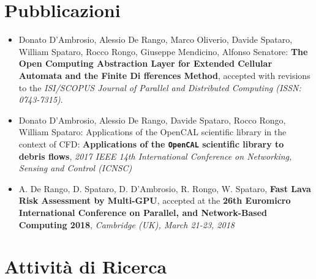 \section{Pubblicazioni}
\begin{itemize}
	\item  Donato D'Ambrosio, Alessio De Rango, Marco Oliverio, Davide Spataro,
	William Spataro, Rocco Rongo, Giuseppe Mendicino, Alfonso Senatore:
	\textbf{The Open Computing Abstraction Layer for Extended Cellular
	Automata and the Finite Di fferences Method}, accepted with revisions to
	the \textit{ISI/SCOPUS Journal of Parallel and Distributed Computing (ISSN:
	0743-7315)}.

\item Donato D'Ambrosio, Alessio De Rango, Davide Spataro, Rocco Rongo,
William Spataro: Applications of the OpenCAL scientific library in
the context of CFD: \textbf{Applications of the \texttt{OpenCAL} scientific library to debris flows}, \textit{2017 IEEE 14th
International Conference on Networking, Sensing and Control (ICNSC)}

\item A. De Rango, D. Spataro, D. D’Ambrosio, R. Rongo, W. Spataro, \textbf{Fast
Lava Risk Assessment by Multi-GPU}, accepted at the \textbf{26th Euromicro
International Conference on Parallel, and Network-Based Computing
2018}, \textit{Cambridge (UK), March 21-23, 2018}

\end{itemize}


\section{Attività di Ricerca}

